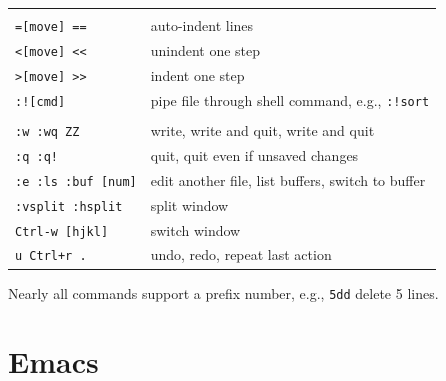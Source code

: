\documentclass[10pt,twoside,openright]{memoir}
\begin{document}
{\begin{tabular}{ll}
& \\
\texttt{=[move] ==} & auto-indent lines \\
\texttt{<[move] <{}<} & unindent one step \\
\texttt{>[move] >{}>} & indent one step \\
\texttt{:![cmd]} & pipe file through shell command, e.g., \texttt{:!sort} \\
& \\
\texttt{:w :wq ZZ} & write, write and quit, write and quit \\
\texttt{:q :q!} & quit, quit even if unsaved changes \\
\texttt{:e :ls :buf [num]} & edit another file, list buffers, switch to buffer \\
\texttt{:vsplit :hsplit} & split window \\
\texttt{Ctrl-w [hjkl]} & switch window \\
\texttt{u Ctrl+r .} & undo, redo, repeat last action \\
\end{tabular}

\vskip 0.1in
\noindent
Nearly all commands support a prefix number, e.g., \texttt{5dd} delete 5 lines.
}


\chapter{Emacs}
\end{document}
